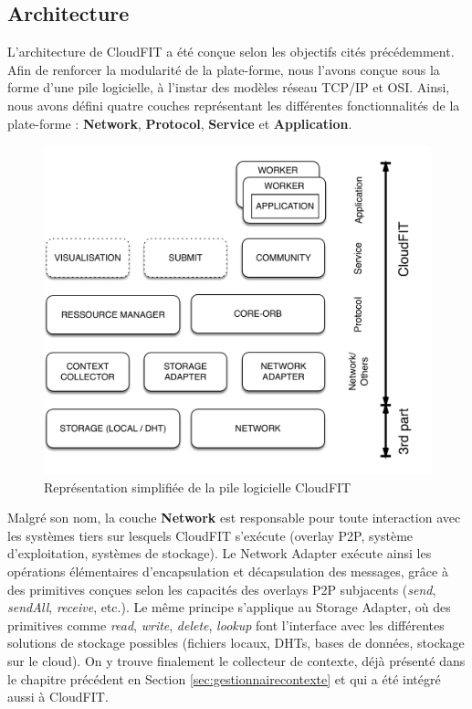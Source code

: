 \subsection{Architecture}

L'architecture de CloudFIT a été conçue selon les objectifs cités précédemment. Afin de renforcer la modularité de la plate-forme, nous l'avons conçue sous la forme d'une pile logicielle, à l'instar des modèles réseau TCP/IP et OSI. Ainsi, nous avons défini quatre couches représentant les différentes fonctionnalités de la plate-forme : \textbf{Network}, \textbf{Protocol}, \textbf{Service} et \textbf{Application}.

\begin{figure}
	\begin{center}
		\includegraphics[width=0.65\linewidth]{img/CloudFITstack}
		\caption{Représentation simplifiée de la pile logicielle CloudFIT}\label{fig:cloudFitStack}
	\end{center}
\end{figure}

Malgré son nom, la couche \textbf{Network} est responsable pour toute interaction avec les systèmes tiers sur lesquels CloudFIT s'exécute (overlay P2P, système  d'exploitation, systèmes de stockage). Le Network Adapter exécute ainsi les opérations élémentaires d'encapsulation et décapsulation des messages, grâce à des primitives conçues selon les capacités des overlays P2P subjacents (\textit{send}, \textit{sendAll}, \textit{receive}, etc.). Le même principe s'applique au Storage Adapter, où des primitives comme \textit{read}, \textit{write}, \textit{delete}, \textit{lookup} font l'interface avec les différentes solutions de stockage possibles (fichiers locaux, DHTs, bases de données, stockage sur le cloud). On y trouve finalement le collecteur de contexte, déjà présenté dans le chapitre précédent en Section \ref{sec:gestionnairecontexte} et qui a été intégré aussi à CloudFIT.

